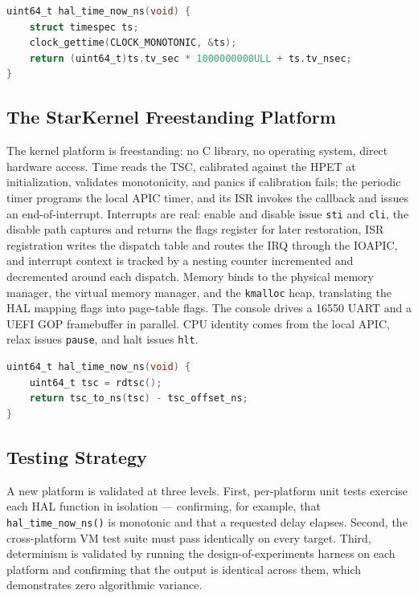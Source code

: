 \begin{lstlisting}[language=C]
uint64_t hal_time_now_ns(void) {
    struct timespec ts;
    clock_gettime(CLOCK_MONOTONIC, &ts);
    return (uint64_t)ts.tv_sec * 1000000000ULL + ts.tv_nsec;
}
\end{lstlisting}

\subsection{The StarKernel Freestanding Platform}

The kernel platform is freestanding: no C library, no operating system, direct
hardware access. Time reads the TSC, calibrated against the HPET at
initialization, validates monotonicity, and panics if calibration fails; the
periodic timer programs the local APIC timer, and its ISR invokes the callback
and issues an end-of-interrupt. Interrupts are real: enable and disable issue
\texttt{sti} and \texttt{cli}, the disable path captures and returns the flags
register for later restoration, ISR registration writes the dispatch table and
routes the IRQ through the IOAPIC, and interrupt context is tracked by a nesting
counter incremented and decremented around each dispatch. Memory binds to the
physical memory manager, the virtual memory manager, and the \texttt{kmalloc}
heap, translating the HAL mapping flags into page-table flags. The console drives
a 16550 UART and a UEFI GOP framebuffer in parallel. CPU identity comes from the
local APIC, relax issues \texttt{pause}, and halt issues \texttt{hlt}.

\begin{lstlisting}[language=C]
uint64_t hal_time_now_ns(void) {
    uint64_t tsc = rdtsc();
    return tsc_to_ns(tsc) - tsc_offset_ns;
}
\end{lstlisting}

\subsection{Testing Strategy}

A new platform is validated at three levels. First, per-platform unit tests
exercise each HAL function in isolation --- confirming, for example, that
\texttt{hal\_time\_now\_ns()} is monotonic and that a requested delay elapses.
Second, the cross-platform VM test suite must pass identically on every target.
Third, determinism is validated by running the design-of-experiments harness on
each platform and confirming that the output is identical across them, which
demonstrates zero algorithmic variance.

